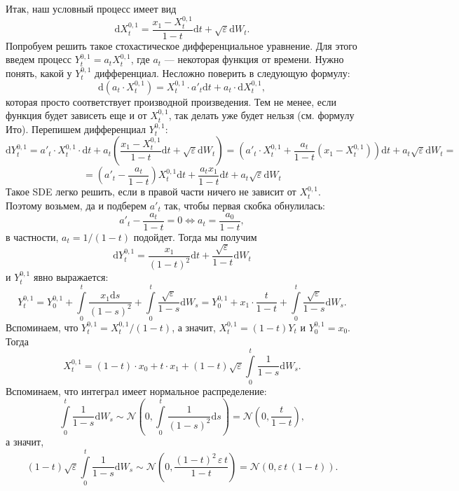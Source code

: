 \documentclass[12pt]{article}
\theoremstyle{definition}
\begin{document}
Итак, наш условный процесс имеет вид
\[
    \mathrm{d} X_t^{0, 1} = \frac{x_1 - X_t^{0, 1}}{1 - t} \mathrm{d} t + \sqrt{\varepsilon} \mathrm{d} W_t.
\]
Попробуем решить такое стохастическое дифференциальное уравнение. Для этого введем процесс $Y_t^{0,1} = a_t X_t^{0, 1}$, где $a_t$ --- некоторая функция от времени. Нужно понять, какой у $Y_t^{0,1}$ дифференциал. Несложно поверить в следующую формулу:
\[
    \mathrm{d} \left(a_t \cdot X_t^{0, 1}\right) = X_t^{0, 1} \cdot a'_t \mathrm{d} t + a_t \cdot \mathrm{d} X_t^{0, 1},
\]
которая просто соответствует производной произведения. Тем не менее, если функция будет зависеть еще и от $X_t^{0, 1}$, так делать уже будет нельзя (см. формулу Ито). Перепишем дифференциал $Y_t^{0,1}$:
\[
    \mathrm{d} Y_t^{0,1} = a'_t \cdot X_t^{0, 1} \cdot \mathrm{d} t + a_t \left(\frac{x_1 - X_t^{0, 1}}{1 - t} \mathrm{d} t + \sqrt{\varepsilon} \mathrm{d} W_t \right) = \left(a'_t \cdot X_t^{0, 1} + \frac{a_t}{1 - t} (x_1 - X_t^{0, 1})\right)\mathrm{d} t + a_t\sqrt{\varepsilon} \mathrm{d} W_t=
\]
\[
    = \left(a'_t - \frac{a_t}{1-t}\right)X_t^{0, 1} \mathrm{d} t + \frac{a_t x_1}{1 - t}\mathrm{d} t + a_t \sqrt{\varepsilon}\mathrm{d} W_t
\]
Такое SDE легко решить, если в правой части ничего не зависит от $X_t^{0, 1}$. Поэтому возьмем, да и подберем $a'_t$ так, чтобы первая скобка обнулилась:
\[
    a'_t - \frac{a_t}{1 - t} = 0 \iff a_t = \frac{a_0}{1 - t},
\]
в частности, $a_t = 1 / (1 - t)$ подойдет. Тогда мы получим
\[
    \mathrm{d} Y_t^{0,1} = \frac{x_1}{(1 - t)^2}\mathrm{d} t + \frac{\sqrt{\varepsilon}}{1 - t} \mathrm{d} W_t
\]
и $Y_t^{0,1}$ явно выражается:
\[
    Y_t^{0,1} = Y_0^{0, 1} + \int \limits_{0}^{t} \frac{x_1\mathrm{d}s}{(1 - s)^2} + \int\limits_{0}^{t} \frac{\sqrt{\varepsilon}}{1 - s} \mathrm{d} W_s = Y_0^{0, 1} + x_1 \cdot \frac{t}{1 - t} + \int\limits_{0}^{t}\frac{\sqrt{\varepsilon}}{1 - s} \mathrm{d} W_s.
\]
Вспоминаем, что $Y_t^{0,1} = X_t^{0, 1} / (1 - t)$, а значит, $X_t^{0, 1} = (1 - t)Y_t$ и $Y_0^{0, 1} = x_0$. Тогда
\[
    X_t^{0, 1} = (1 - t) \cdot x_0 + t  \cdot x_1 + (1 - t)\sqrt{\varepsilon}\int\limits_{0}^{t}\frac{1}{1 - s}\mathrm{d}W_s.
\]
Вспоминаем, что интеграл имеет нормальное распределение:
\[
    \int \limits_{0}^{t} \frac{1}{1 - s}\mathrm{d} W_s \sim \mathcal{N}\left(0, \int \limits_{0}^{t} \frac{1}{(1 - s)^2}\mathrm{d} s \right) = \mathcal{N}\left(0, \frac{t}{1 - t}\right),
\]
а значит, 
\[
    (1 - t)\sqrt{\varepsilon}\int\limits_{0}^{t} \frac{1}{1 - s}\mathrm{d} W_s \sim \mathcal{N}\left(0, \frac{(1 - t)^2 \, \varepsilon \, t}{1 - t}\right) = \mathcal{N}\left(0, \varepsilon\, t \,(1 - t)\right).
\]
\end{document}
